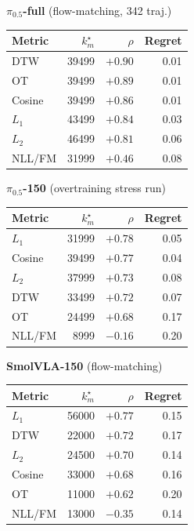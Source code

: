 \documentclass[english,12pt,a4paper,pdftex,elec,utf8]{aaltothesis}
\begin{document}
\begin{table}[h]
\vspace{1em}

\begin{minipage}[t]{0.48\textwidth}
\centering \textbf{$\pi_{0.5}$-full} (flow-matching, 342 traj.)\\[2pt]
\begin{tabular}{lrrr}
\toprule
Metric & $k_m^\star$ & $\rho$ & Regret \\ \midrule
DTW    & 39499 & $+0.90$ & 0.01 \\
OT     & 39499 & $+0.89$ & 0.01 \\
Cosine & 39499 & $+0.86$ & 0.01 \\
$L_1$  & 43499 & $+0.84$ & 0.03 \\
$L_2$  & 46499 & $+0.81$ & 0.06 \\
NLL/FM & 31999 & $+0.46$ & 0.08 \\
\bottomrule
\end{tabular}
\end{minipage}
\hfill
\begin{minipage}[t]{0.48\textwidth}
\centering \textbf{$\pi_{0.5}$-150} (overtraining stress run)\\[2pt]
\begin{tabular}{lrrr}
\toprule
Metric & $k_m^\star$ & $\rho$ & Regret \\ \midrule
$L_1$  & 31999 & $+0.78$ & 0.05 \\
Cosine & 39499 & $+0.77$ & 0.04 \\
$L_2$  & 37999 & $+0.73$ & 0.08 \\
DTW    & 33499 & $+0.72$ & 0.07 \\
OT     & 24499 & $+0.68$ & 0.17 \\
NLL/FM &  8999 & $-0.16$ & 0.20 \\
\bottomrule
\end{tabular}
\end{minipage}

\vspace{1em}
\centering
\begin{minipage}[t]{0.48\textwidth}
\centering \textbf{SmolVLA-150} (flow-matching)\\[2pt]
\begin{tabular}{lrrr}
\toprule
Metric & $k_m^\star$ & $\rho$ & Regret \\ \midrule
$L_1$  & 56000 & $+0.77$ & 0.15 \\
DTW    & 22000 & $+0.72$ & 0.17 \\
$L_2$  & 24500 & $+0.70$ & 0.14 \\
Cosine & 33000 & $+0.68$ & 0.16 \\
OT     & 11000 & $+0.62$ & 0.20 \\
NLL/FM & 13000 & $-0.35$ & 0.14 \\
\bottomrule
\end{tabular}
\end{minipage}
\end{table}
\end{document}
